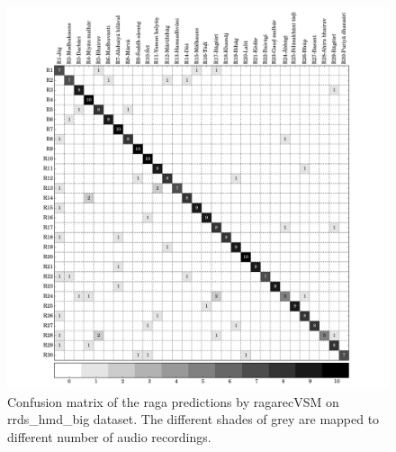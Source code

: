 \begin{figure}[h]
	\begin{center}
		\includegraphics[width=\figSizeNinety]{ch07_ragaRecognition/figures/CM_vsm_hmd_var1.pdf}
	\end{center}
	\caption[Confusion matrix of classification results by \acrshort{ragarecVSM} on \acrshort{rrds_hmd_big}]{Confusion matrix of the \gls{raga} predictions by \acrshort{ragarecVSM} on \acrshort{rrds_hmd_big} dataset. The different shades of grey are mapped to different number of audio recordings.}
	\label{fig:confusion_matrix_hmd}
\end{figure}

